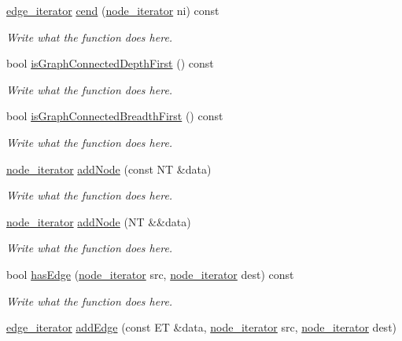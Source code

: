 \begin{DoxyCompactItemize}
\hyperlink{classgraph_1_1edge__iterator}{edge\+\_\+iterator} \hyperlink{classgraph_a7165be7146a4f54364b3b6060af2f42a}{cend} (\hyperlink{classgraph_1_1node__iterator}{node\+\_\+iterator} ni) const 
\begin{DoxyCompactList}\small\item\em Write what the function does here. \end{DoxyCompactList}\item 
bool \hyperlink{classgraph_aaec1657b0786d291b8ec3e916c888ddd}{is\+Graph\+Connected\+Depth\+First} () const 
\begin{DoxyCompactList}\small\item\em Write what the function does here. \end{DoxyCompactList}\item 
bool \hyperlink{classgraph_ad5fac5d1e968a1fd89e816e9c320b05f}{is\+Graph\+Connected\+Breadth\+First} () const 
\begin{DoxyCompactList}\small\item\em Write what the function does here. \end{DoxyCompactList}\item 
\hyperlink{classgraph_1_1node__iterator}{node\+\_\+iterator} \hyperlink{classgraph_a8465347e19dc13e8685c33cd71738a80}{add\+Node} (const N\+T \&data)
\begin{DoxyCompactList}\small\item\em Write what the function does here. \end{DoxyCompactList}\item 
\hyperlink{classgraph_1_1node__iterator}{node\+\_\+iterator} \hyperlink{classgraph_a2417ef9e682bf1ed4ab3c6d3c0b4dac4}{add\+Node} (N\+T \&\&data)
\begin{DoxyCompactList}\small\item\em Write what the function does here. \end{DoxyCompactList}\item 
bool \hyperlink{classgraph_a8db619fbe866a5082fb675039f650e7f}{has\+Edge} (\hyperlink{classgraph_1_1node__iterator}{node\+\_\+iterator} src, \hyperlink{classgraph_1_1node__iterator}{node\+\_\+iterator} dest) const 
\begin{DoxyCompactList}\small\item\em Write what the function does here. \end{DoxyCompactList}\item 
\hyperlink{classgraph_1_1edge__iterator}{edge\+\_\+iterator} \hyperlink{classgraph_a6a92c77420e9cfc42a54585be4015e6b}{add\+Edge} (const E\+T \&data, \hyperlink{classgraph_1_1node__iterator}{node\+\_\+iterator} src, \hyperlink{classgraph_1_1node__iterator}{node\+\_\+iterator} dest)

\end{DoxyCompactItemize}
